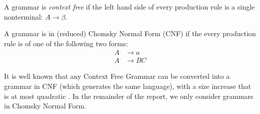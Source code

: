 \begin{Definition}
  A grammar is \emph{context free} if the left hand side of every production rule is a single nonterminal: $A \to \beta$.
\end{Definition}
\begin{Definition}
  A grammar is in (reduced) Chomsky Normal Form (CNF) \citep{Chomsky} if the every production rule is of one of the following two forms:
  \begin{align*}
  A &\to a\\
  A &\to BC 
  \end{align*}
\end{Definition}
It is well known that any Context Free Grammar can be converted into a grammar in CNF (which generates the same language), with a size increase that is at most quadratic \citep{Lange-Leiss}.
In the remainder of the report, we only consider grammars in Chomsky Normal Form.
